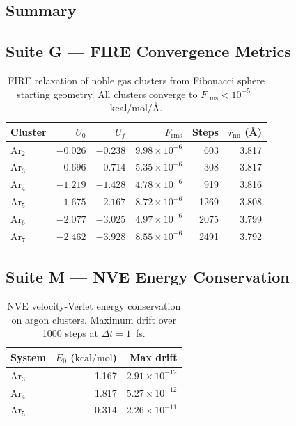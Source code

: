 \documentclass[11pt,twoside]{article}
\newcommand{\Angstrom}{\text{\AA}}
\newcommand{\kcalmol}{\text{kcal/mol}}
\newcommand{\Frms}{F_{\mathrm{rms}}}
\begin{document}
\subsection{Summary}

\begin{center}
\end{center}

\subsection{Suite G --- FIRE Convergence Metrics}

\begin{table}[H]
\centering
\caption{FIRE relaxation of noble gas clusters from Fibonacci sphere
starting geometry.  All clusters converge to $\Frms < 10^{-5}$~$\kcalmol/\Angstrom$.}
\label{tab:fire}
\begin{tabular}{lrrrrr}
\toprule
\textbf{Cluster} & $U_0$ & $U_f$ & $\Frms$ & \textbf{Steps} & $r_{\mathrm{nn}}$ (\AA) \\
\midrule
Ar$_2$ & $-0.026$ & $-0.238$ & $9.98 \times 10^{-6}$ & 603 & 3.817 \\
Ar$_3$ & $-0.696$ & $-0.714$ & $5.35 \times 10^{-6}$ & 308 & 3.817 \\
Ar$_4$ & $-1.219$ & $-1.428$ & $4.78 \times 10^{-6}$ & 919 & 3.816 \\
Ar$_5$ & $-1.675$ & $-2.167$ & $8.72 \times 10^{-6}$ & 1269 & 3.808 \\
Ar$_6$ & $-2.077$ & $-3.025$ & $4.97 \times 10^{-6}$ & 2075 & 3.799 \\
Ar$_7$ & $-2.462$ & $-3.928$ & $8.55 \times 10^{-6}$ & 2491 & 3.792 \\
\bottomrule
\end{tabular}
\end{table}

\subsection{Suite M --- NVE Energy Conservation}

\begin{table}[H]
\centering
\caption{NVE velocity-Verlet energy conservation on argon clusters.
Maximum drift over 1000 steps at $\Delta t = 1$~fs.}
\label{tab:nve}
\begin{tabular}{lrr}
\toprule
\textbf{System} & $E_0$ ($\kcalmol$) & \textbf{Max drift} \\
\midrule
Ar$_3$ & 1.167 & $2.91 \times 10^{-12}$ \\
Ar$_4$ & 1.817 & $5.27 \times 10^{-12}$ \\
Ar$_5$ & 0.314 & $2.26 \times 10^{-11}$ \\
\bottomrule
\end{tabular}
\end{table}
\end{document}
